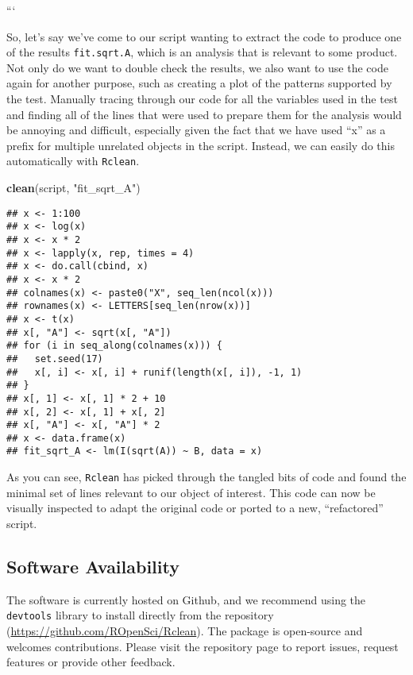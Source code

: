 \documentclass[]{article}
\newenvironment{Shaded}{\begin{snugshade}}{\end{snugshade}}
\newcommand{\KeywordTok}[1]{\textcolor[rgb]{0.13,0.29,0.53}{\textbf{{#1}}}}
\newcommand{\StringTok}[1]{\textcolor[rgb]{0.31,0.60,0.02}{{#1}}}
\newcommand{\NormalTok}[1]{{#1}}
\begin{document}
```

So, let's say we've come to our script wanting to extract the code to
produce one of the results \texttt{fit.sqrt.A}, which is an analysis
that is relevant to some product. Not only do we want to double check
the results, we also want to use the code again for another purpose,
such as creating a plot of the patterns supported by the test. Manually
tracing through our code for all the variables used in the test and
finding all of the lines that were used to prepare them for the analysis
would be annoying and difficult, especially given the fact that we have
used ``x'' as a prefix for multiple unrelated objects in the script.
Instead, we can easily do this automatically with \texttt{Rclean}.

\begin{Shaded}
\begin{Highlighting}[]
\KeywordTok{clean}\NormalTok{(script, }\StringTok{"fit_sqrt_A"}\NormalTok{)}
\end{Highlighting}
\end{Shaded}

\begin{verbatim}
## x <- 1:100
## x <- log(x)
## x <- x * 2
## x <- lapply(x, rep, times = 4)
## x <- do.call(cbind, x)
## x <- x * 2
## colnames(x) <- paste0("X", seq_len(ncol(x)))
## rownames(x) <- LETTERS[seq_len(nrow(x))]
## x <- t(x)
## x[, "A"] <- sqrt(x[, "A"])
## for (i in seq_along(colnames(x))) {
##   set.seed(17)
##   x[, i] <- x[, i] + runif(length(x[, i]), -1, 1)
## }
## x[, 1] <- x[, 1] * 2 + 10
## x[, 2] <- x[, 1] + x[, 2]
## x[, "A"] <- x[, "A"] * 2
## x <- data.frame(x)
## fit_sqrt_A <- lm(I(sqrt(A)) ~ B, data = x)
\end{verbatim}

As you can see, \texttt{Rclean} has picked through the tangled bits of
code and found the minimal set of lines relevant to our object of
interest. This code can now be visually inspected to adapt the original
code or ported to a new, ``refactored'' script.

\subsection{Software Availability}\label{software-availability}

The software is currently hosted on Github, and we recommend using the
\texttt{devtools} library to install directly from the repository
(\url{https://github.com/ROpenSci/Rclean}). The package is open-source
and welcomes contributions. Please visit the repository page to report
issues, request features or provide other feedback.
\end{document}
